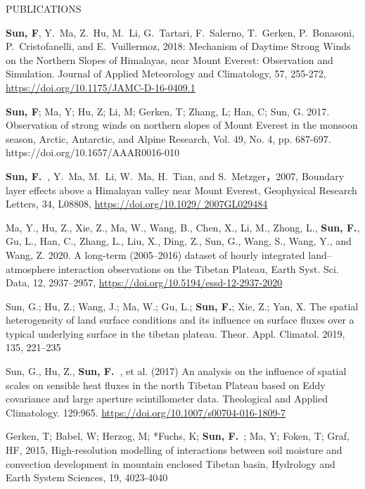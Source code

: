 \documentclass{resume} %
\begin{document}
\begin{rSection}{PUBLICATIONS}
\begin{etaremune}
  \item {\bf Sun, F}, Y.~Ma, Z.~Hu, M.~Li, G.~Tartari, F.~Salerno, T.~Gerken, P.~Bonasoni, P.~Cristofanelli, and E.~Vuillermoz, 2018: Mechanism of Daytime Strong Winds on the Northern Slopes of Himalayas, near Mount Everest: Observation and Simulation. Journal of Applied Meteorology and Climatology, 57, 255-272, \url{https://doi.org/10.1175/JAMC-D-16-0409.1}
  \item {\bf Sun, F}; Ma, Y; Hu, Z; Li, M; Gerken, T; Zhang, L; Han, C; Sun, G. 2017. Observation of strong winds on northern slopes of Mount Everest in the monsoon season, Arctic, Antarctic, and Alpine Research, Vol. 49, No. 4, pp. 687-697. https://doi.org/10.1657/AAAR0016-010
  \item {\bf Sun, F.~}, Y.~Ma, M.~Li, W.~Ma, H.~Tian, and S.~Metzger，2007, Boundary layer effects above a Himalayan valley near Mount Everest, Geophysical Research Letters, 34, L08808, \url{https://doi.org/10.1029/ 2007GL029484}
  \item Ma, Y., Hu, Z., Xie, Z., Ma, W., Wang, B., Chen, X., Li, M., Zhong, L., {\bf Sun, F.}, Gu, L., Han, C., Zhang, L., Liu, X., Ding, Z., Sun, G., Wang, S., Wang, Y., and Wang, Z. 2020. A long-term (2005–2016) dataset of hourly integrated land–atmosphere interaction observations on the Tibetan Plateau, Earth Syst. Sci. Data, 12, 2937–2957, \url{https://doi.org/10.5194/essd-12-2937-2020}
  \item Sun, G.; Hu, Z.; Wang, J.; Ma, W.; Gu, L.; {\bf Sun, F.}; Xie, Z.; Yan, X. The spatial heterogeneity of land surface conditions and its influence on surface fluxes over a typical underlying surface in the tibetan plateau. Theor. Appl. Climatol. 2019, 135, 221–235
  \item Sun, G., Hu, Z., {\bf Sun, F.~}, et al. (2017) An analysis on the influence of spatial scales on sensible heat fluxes in the north Tibetan Plateau based on Eddy covariance and large aperture scintillometer data. Theological and Applied Climatology. 129:965. \url{https://doi.org/10.1007/s00704-016-1809-7} 
  \item Gerken, T; Babel, W; Herzog, M; *Fuchs, K; {\bf Sun, F.}~; Ma, Y; Foken, T; Graf, HF, 2015, High-resolution modelling of interactions between soil moisture and convection development in mountain enclosed Tibetan basin, Hydrology and Earth System Sciences, 19, 4023-4040

\end{etaremune}
\end{rSection}
\end{document}
